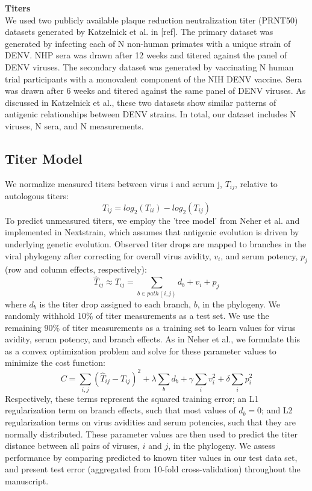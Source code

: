 \documentclass[11pt,oneside,letterpaper]{article}
\begin{document}
\textbf{Titers}\\
We used two publicly available plaque reduction neutralization titer (PRNT50) datasets generated by Katzelnick et al. in {[}ref{]}.
The primary dataset was generated by infecting each of N non-human primates with a unique strain of DENV.
NHP sera was drawn after 12 weeks and titered against the panel of DENV viruses.
The secondary dataset was generated by vaccinating N human trial participants with a monovalent component of the NIH DENV vaccine.
Sera was drawn after 6 weeks and titered against the same panel of DENV viruses.
As discussed in Katzelnick et al., these two datasets show similar patterns of antigenic relationships between DENV strains.
In total, our dataset includes N viruses, N sera, and N measurements.

\subsection*{Titer Model}
We normalize measured titers between virus i and serum j, $T_{ij}$, relative to autologous titers: $$T_{ij} = log_2(T_{ii}) - log_2(T_{ij})$$
To predict unmeasured titers, we employ the 'tree model' from Neher et al. and implemented in Nextstrain, which assumes that antigenic evolution is driven by underlying genetic evolution.
Observed titer drops are mapped to branches in the viral phylogeny after correcting for overall virus avidity, $v_i$, and serum potency, $p_j$ (row and column effects, respectively):
$$\hat{T}_{ij} \approx T_{ij} = \sum_{b \in path(i,j)} d_b + v_i + p_j$$
where $d_b$ is the titer drop assigned to each branch, $b$, in the phylogeny.
We randomly withhold 10\% of titer measurements as a test set.
We use the remaining 90\% of titer measurements as a training set to learn values for virus avidity, serum potency, and branch effects.
As in Neher et al., we formulate this as a convex optimization problem and solve for these parameter values to minimize the cost function:
$$C = \sum_{i,j} (\hat{T}_{ij} - T_{ij})^2 + \lambda \sum_{b} d_b + \gamma \sum_{i} v_i^2 + \delta \sum_{i} p_i^2$$
Respectively, these terms represent the squared training error; an L1 regularization term on branch effects, such that most values of $d_b = 0$; and L2 regularization terms on virus avidities and serum potencies, such that they are normally distributed.
These parameter values are then used to predict the titer distance between all pairs of viruses, $i$ and $j$, in the phylogeny.
We assess performance by comparing predicted to known titer values in our test data set, and present test error (aggregated from 10-fold cross-validation) throughout the manuscript.
\end{document}
